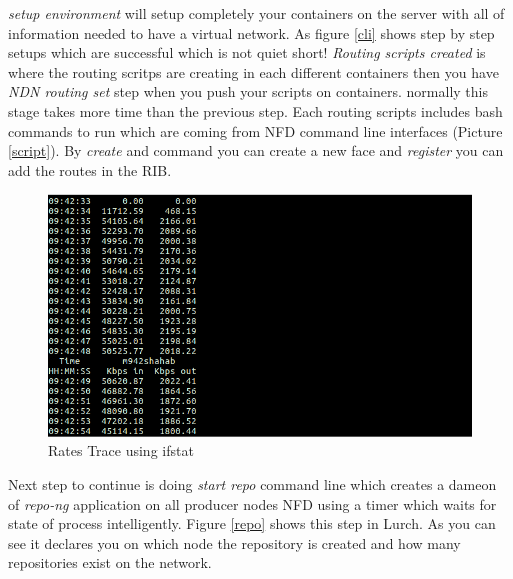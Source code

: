  
\textit{setup environment} will setup completely your containers on the server with all of information needed to have a virtual network. As figure \ref{cli} shows step by step setups which are successful which is not quiet short! \textit{Routing scripts created} is where the routing scritps are creating in each different containers then you have \textit{NDN routing set} step when you push your scripts on containers. normally this stage takes more time than the previous step. Each routing scripts includes bash commands to run which are coming from NFD command line interfaces (Picture \ref{script}). By \textit{create} and  command you can create a new face and \textit{register} you can add the routes in the RIB.   
 
\begin{figure}[H]

\begin{center}

\includegraphics[scale = 0.35]{Pictures/data.png}

\caption{Rates Trace using ifstat} \label{data} 

\end{center}

\end{figure}
 
 
 
Next step to continue is doing \textit{start repo} command line which creates a dameon of \textit{repo-ng} application on all producer nodes NFD using a timer which waits for state of process intelligently. Figure \ref{repo} shows this step in Lurch. As you can see it declares you on which node the repository is created and how many repositories exist on the network.



